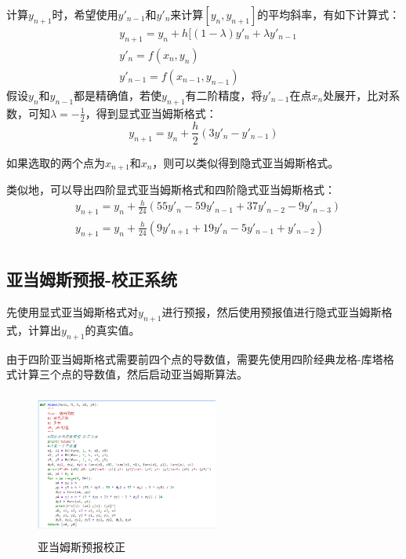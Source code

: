 \documentclass{article}
\begin{document}
	计算$y_{n+1}$时，希望使用$y'_{n-1}$和$y'_n$来计算$[y_n, y_{n+1}]$的平均斜率，有如下计算式：
$$
\begin{aligned}
&y_{n+1}=y_n+h[(1-\lambda)y'_n+\lambda y'_{n-1}\\
&y'_n=f(x_n, y_n)\\
&y'_{n-1}=f(x_{n-1}, y_{n-1})
\end{aligned}
$$
假设$y_n$和$y_{n-1}$都是精确值，若使$y_{n+1}$有二阶精度，将$y'_{n-1}$在点$x_n$处展开，比对系数，可知$\lambda=-\frac{1}{2}$，得到显式亚当姆斯格式：
$$
y_{n+1}=y_n+\frac{h}{2}(3y'_n-y'_{n-1})
$$

如果选取的两个点为$x_{n+1}$和$x_n$，则可以类似得到隐式亚当姆斯格式。

类似地，可以导出四阶显式亚当姆斯格式和四阶隐式亚当姆斯格式：
$$
\begin{aligned}
&y_{n+1}=y_n+\frac{h}{24}(55y'_n-59y'_{n-1}+37y'_{n-2}-9y'_{n-3})\\
&y_{n+1}=y_n+\frac{h}{24}(9y'_{n+1}+19y'_n-5y'_{n-1}+y'_{n-2})\\
\end{aligned}
$$

	\subsection{亚当姆斯预报-校正系统}
先使用显式亚当姆斯格式对$y_{n+1}$进行预报，然后使用预报值进行隐式亚当姆斯格式，计算出$y_{n+1}$的真实值。

由于四阶亚当姆斯格式需要前四个点的导数值，需要先使用四阶经典龙格-库塔格式计算三个点的导数值，然后启动亚当姆斯算法。
\begin{figure}[tbp]
\centering
\includegraphics[width=6cm,height=4.8cm]{adams.png}
\caption{亚当姆斯预报校正}
\end{figure}
\newpage
\end{document}
